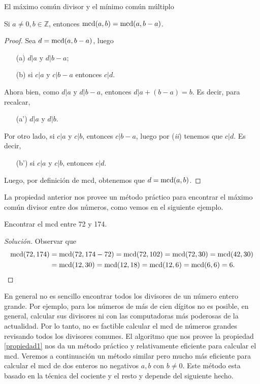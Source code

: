 \begin{section}{El máximo común divisor y el mínimo común
múltiplo}
\begin{propiedad}\label{propiedad1}
	Si $a \not=0, b \in \mathbb Z$, entonces $\operatorname{mcd}(a,b) = \operatorname{mcd}(a,b-a)$. 
\end{propiedad}
\begin{proof}
	Sea $d =  \operatorname{mcd}(a,b-a)$, luego 
	\begin{enumerate}
		\item[({a})] $ d|a$ y $d|b -a$;
		\item[({b})] si $ c|a $ y $c|b -a$ entonces $ c|d$.
	\end{enumerate}
	Ahora bien, como  $ d|a$ y $d|b -a$, entonces $  d|a +(b -a) = b$. Es decir, para recalcar,
	\begin{enumerate}
		\item[({a'})] $ d|a$ y $d|b$.
	\end{enumerate}
	Por otro lado, si  $ c|a $ y $c|b$, entonces  $c|b -a$, luego por ({\em ii}) tenemos que $c|d$. Es decir, 
	\begin{enumerate}
		\item[({b'})] si  $ c|a $ y $c|b$, entonces  $c|d$.
	\end{enumerate}
	Luego, por definición de mcd, obtenemos que $d = \operatorname{mcd}(a,b)$.
\end{proof}

La propiedad anterior nos provee un método práctico para encontrar el máximo común divisor entre dos números, como vemos en el siguiente ejemplo.

\begin{ejemplo} Encontrar el mcd entre 72 y 174.
	\begin{proof}[Solución] Observar que 
		\begin{align*}
		\operatorname{mcd}(72, 174) &= \operatorname{mcd}(72,174-72) = \operatorname{mcd}(72,102) = \operatorname{mcd}(72,30) =  \operatorname{mcd}(42, 30) \\&= \operatorname{mcd}(12,30) = \operatorname{mcd}(12,18)= \operatorname{mcd}(12,6)= \operatorname{mcd}(6,6) = 6.  
		\end{align*}
	\end{proof}
\end{ejemplo} 

En  general no es sencillo encontrar todos los divisores de un número entero grande. Por ejemplo, para los  números de más de cien dígitos no es posible,  en general, calcular sus divisores ni con las computadoras más poderosas de la actualidad. Por  lo tanto, no es factible calcular el  mcd de números grandes revisando todos los divisores comunes.  El algoritmo que nos provee la  propiedad \ref{propiedad1} nos da un método práctico y relativamente eficiente para calcular el mcd. Veremos a continuación un método similar pero mucho más eficiente para calcular el mcd de dos enteros no negativos $a,b$ con $b \not=0$. Este método esta basado en la técnica del cociente y el resto y depende del siguiente hecho.


\end{section}

